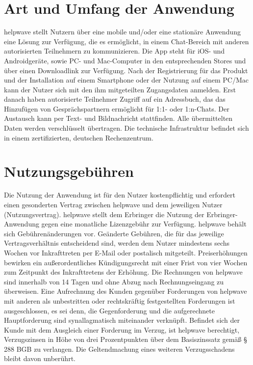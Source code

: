 \documentclass[10pt]{article}
\begin{document}
\section{Art und Umfang der Anwendung}
helpwave stellt Nutzern über eine mobile und/oder eine stationäre Anwendung eine Lösung zur Verfügung, die es ermöglicht, in einem Chat-Bereich mit anderen autorisierten Teilnehmern zu kommunizieren. Die App steht für iOS- und Androidgeräte, sowie PC- und Mac-Computer in den entsprechenden Stores und über einen Downloadlink zur Verfügung.
Nach der Registrierung für das Produkt und der Installation auf einem Smartphone oder der Nutzung auf einem PC/Mac
kann der Nutzer sich mit den ihm mitgeteilten Zugangsdaten anmelden. Erst danach haben autorisierte Teilnehmer Zugriff
auf ein Adressbuch, das das Hinzufügen von Gesprächspartnern ermöglicht für 1:1- oder 1:n-Chats. Der Austausch kann per
Text- und Bildnachricht stattfinden. Alle übermittelten Daten werden verschlüsselt übertragen. Die technische Infrastruktur
befindet sich in einem zertifizierten, deutschen Rechenzentrum.

\section{Nutzungsgebühren}
Die Nutzung der Anwendung ist für den Nutzer kostenpflichtig und erfordert einen gesonderten Vertrag zwischen helpwave
und dem jeweiligen Nutzer (Nutzungsvertrag).
helpwave stellt dem Erbringer die Nutzung der Erbringer-Anwendung gegen eine monatliche Lizenzgebühr zur Verfügung. helpwave behält sich Gebührenänderungen vor. Geänderte Gebühren, die für das jeweilige Vertragsverhältnis entscheidend sind, werden dem Nutzer mindestens sechs Wochen vor Inkrafttreten per E-Mail oder postalisch mitgeteilt. Preiserhöhungen bewirken ein außerordentliches Kündigungsrecht mit einer Frist von vier Wochen zum Zeitpunkt des Inkrafttretens der Erhöhung. Die Rechnungen von helpwave sind innerhalb von 14 Tagen und ohne Abzug nach Rechnungseingang zu überweisen. Eine Aufrechnung des Kunden gegenüber Forderungen von helpwave mit anderen als unbestritten oder rechtskräftig festgestellten Forderungen ist ausgeschlossen, es sei denn, die Gegenforderung und die aufgerechnete Hauptforderung sind synallagmatisch miteinander verknüpft. Befindet sich der Kunde mit dem Ausgleich einer Forderung im Verzug, ist helpwave berechtigt, Verzugszinsen in Höhe von drei Prozentpunkten über dem Basiszinssatz gemäß § 288 BGB zu verlangen. Die Geltendmachung eines weiteren Verzugsschadens bleibt davon unberührt.
\end{document}
